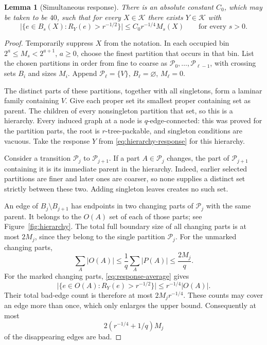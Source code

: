 \documentclass[11pt]{amsart}
\newtheorem{lemma}[theorem]{Lemma}
\theoremstyle{definition}
\theoremstyle{remark}
\numberwithin{equation}{section}
\begin{document}
\begin{lemma}[Simultaneous response]\label{lem:response}
There is an absolute constant \(C_0\), which may be taken to be \(40\),
such that for every \(X\in\mathcal K\) there exists \(Y\in\mathcal K\)
with
\begin{equation}\label{eq:simultaneous-response}
 \bigl|\{e\in B_s(X):R_Y(e)>r^{-1/2}\}\bigr|
 \le C_0r^{-1/4}M_s(X)
 \qquad\text{for every }s>0.
\end{equation}
\end{lemma}
\begin{proof}
Temporarily suppress \(X\) from the notation.
In each occupied bin \(2^a\le M_s<2^{a+1}\), \(a\ge0\),
choose the finest partition that occurs in that bin.
List the chosen partitions in order from fine to coarse as
\(\mathcal P_0,\ldots,\mathcal P_{\ell-1}\), with crossing sets
\(B_i\) and sizes \(M_i\). Append
\(\mathcal P_\ell=\{V\}\), \(B_\ell=\varnothing\), \(M_\ell=0\).

The distinct parts of these partitions, together with all
singletons, form a laminar family containing \(V\).
Give each proper set its smallest proper containing set as parent.
The children of every nonsingleton partition that set, so this is
a hierarchy. Every induced graph at a node is \(q\)-edge-connected:
this was proved for the partition parts, the root is
\(r\)-tree-packable, and singleton conditions are vacuous.
Take the response \(Y\) from \eqref{eq:hierarchy-response} for this
hierarchy.

Consider a transition \(\mathcal P_j\) to \(\mathcal P_{j+1}\).
If a part \(A\in\mathcal P_j\) changes, the part of
\(\mathcal P_{j+1}\) containing it is its immediate parent in the
hierarchy. Indeed, earlier selected partitions are finer and later
ones are coarser, so none supplies a distinct set strictly between
these two. Adding singleton leaves creates no such set.

An edge of \(B_j\setminus B_{j+1}\) has endpoints in two changing
parts of \(\mathcal P_j\) with the same parent. It belongs to the
\(O(A)\) set of each of those parts; see Figure~\ref{fig:hierarchy}.
The total full boundary size of all changing parts is at most
\(2M_j\), since they belong to the single partition \(\mathcal P_j\).
For the unmarked changing parts,
\[
 \sum_A |O(A)|\le \frac1q\sum_A|P(A)|\le\frac{2M_j}{q}.
\]
For the marked changing parts, \eqref{eq:response-average} gives
\[
 \bigl|\{e\in O(A):R_Y(e)>r^{-1/2}\}\bigr|
 \le r^{-1/4}|O(A)|.
\]
Their total bad-edge count is therefore at most \(2M_jr^{-1/4}\).
These counts may cover an edge more than once, which only enlarges
the upper bound. Consequently at most
\[
 2(r^{-1/4}+1/q)M_j
\]
of the disappearing edges are bad.


\end{proof}
\end{document}
